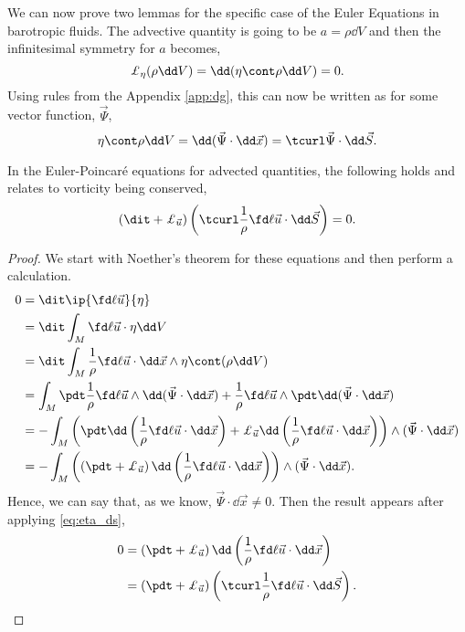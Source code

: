 \noindent
We can now prove two lemmas for the specific case of the Euler Equations in barotropic fluids. The advective quantity is going to be $a = \rho\dd V$ and then the infinitesimal symmetry for $a$ becomes,
$$ \pounds_\eta (\rho \dd V) = \dd (\eta \cont \rho \dd V) = 0. $$
Using rules from the Appendix \ref{app:dg}, this can now be written as for some vector function, $\vec\Psi$,
\begin{equation}
  \eta \cont \rho \dd V = \dd (\vec \Psi \cdot \dd \vec x) = \tcurl \vec\Psi \cdot \dd \vec S.\label{eq:eta_ds}
\end{equation}
\noindent
\begin{nlemma}
  In the Euler-Poincar\'e equations for advected quantities, the following holds and relates to vorticity being conserved,
  \begin{equation}
    \left( \dit + \pounds_{\vec u} \right)\left(\tcurl \frac{1}{\rho}\fd \ell {\vec u} \cdot \dd \vec S\right) = 0.\label{eq:voricity}
  \end{equation}
\end{nlemma}
\begin{proof}
  We start with Noether's theorem for these equations and then perform a calculation.
  \begin{align*}
    0 &= \dit \ip{\fd \ell {\vec u}}{\eta} \\
    &= \dit \int_M \fd \ell {\vec u} \cdot \eta\dd V \\
    &= \dit \int_M \frac{1}{\rho}\fd \ell {\vec u} \cdot \dd \vec x \wedge \eta \cont (\rho \dd V) \\
    &= \int_M \pdt \frac{1}{\rho}\fd \ell {\vec u} \wedge \dd(\vec\Psi \cdot \dd \vec x) + \frac{1}{\rho}\fd \ell {\vec u} \wedge \pdt \dd(\vec\Psi \cdot \dd \vec x) \\
    &= - \int_M \left( \pdt \dd \left( \frac{1}{\rho}\fd \ell {\vec u} \cdot \dd \vec x \right) + \pounds_{\vec u} \dd \left( \frac{1}{\rho}\fd \ell {\vec u} \cdot \dd \vec x \right) \right) \wedge (\vec\Psi \cdot \dd \vec x)  \\
    &= - \int_M \left(\left( \pdt + \pounds_{\vec u} \right) \dd \left( \frac{1}{\rho}\fd \ell {\vec u} \cdot \dd \vec x \right)\right) \wedge (\vec\Psi \cdot \dd \vec x).
  \end{align*}
  Hence, we can say that, as we know, $\vec\Psi \cdot \dd \vec x \ne 0$. Then the result appears after applying \eqref{eq:eta_ds},
  \begin{align*}
    0 &= \left( \pdt + \pounds_{\vec u} \right) \dd \left( \frac{1}{\rho}\fd \ell {\vec u} \cdot \dd \vec x \right) \\
    &= \left( \pdt + \pounds_{\vec u} \right) \left( \tcurl \frac{1}{\rho}\fd \ell {\vec u} \cdot \dd \vec S \right).
  \end{align*}
\end{proof}

